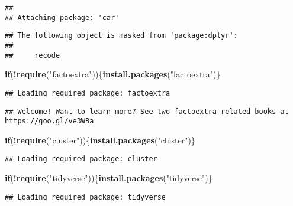 \documentclass[
]{article}
\newenvironment{Shaded}{\begin{snugshade}}{\end{snugshade}}
\newcommand{\ControlFlowTok}[1]{\textcolor[rgb]{0.13,0.29,0.53}{\textbf{#1}}}
\newcommand{\KeywordTok}[1]{\textcolor[rgb]{0.13,0.29,0.53}{\textbf{#1}}}
\newcommand{\NormalTok}[1]{#1}
\newcommand{\OperatorTok}[1]{\textcolor[rgb]{0.81,0.36,0.00}{\textbf{#1}}}
\newcommand{\StringTok}[1]{\textcolor[rgb]{0.31,0.60,0.02}{#1}}
\begin{document}
\begin{verbatim}
## 
## Attaching package: 'car'
\end{verbatim}

\begin{verbatim}
## The following object is masked from 'package:dplyr':
## 
##     recode
\end{verbatim}

\begin{Shaded}
\begin{Highlighting}[]
\ControlFlowTok{if}\NormalTok{(}\OperatorTok{!}\KeywordTok{require}\NormalTok{(}\StringTok{"factoextra"}\NormalTok{))\{}\KeywordTok{install.packages}\NormalTok{(}\StringTok{"factoextra"}\NormalTok{)\}}
\end{Highlighting}
\end{Shaded}

\begin{verbatim}
## Loading required package: factoextra
\end{verbatim}

\begin{verbatim}
## Welcome! Want to learn more? See two factoextra-related books at https://goo.gl/ve3WBa
\end{verbatim}

\begin{Shaded}
\begin{Highlighting}[]
\ControlFlowTok{if}\NormalTok{(}\OperatorTok{!}\KeywordTok{require}\NormalTok{(}\StringTok{"cluster"}\NormalTok{))\{}\KeywordTok{install.packages}\NormalTok{(}\StringTok{"cluster"}\NormalTok{)\}}
\end{Highlighting}
\end{Shaded}

\begin{verbatim}
## Loading required package: cluster
\end{verbatim}

\begin{Shaded}
\begin{Highlighting}[]
\ControlFlowTok{if}\NormalTok{(}\OperatorTok{!}\KeywordTok{require}\NormalTok{(}\StringTok{"tidyverse"}\NormalTok{))\{}\KeywordTok{install.packages}\NormalTok{(}\StringTok{"tidyverse"}\NormalTok{)\}}
\end{Highlighting}
\end{Shaded}

\begin{verbatim}
## Loading required package: tidyverse
\end{verbatim}
\end{document}

